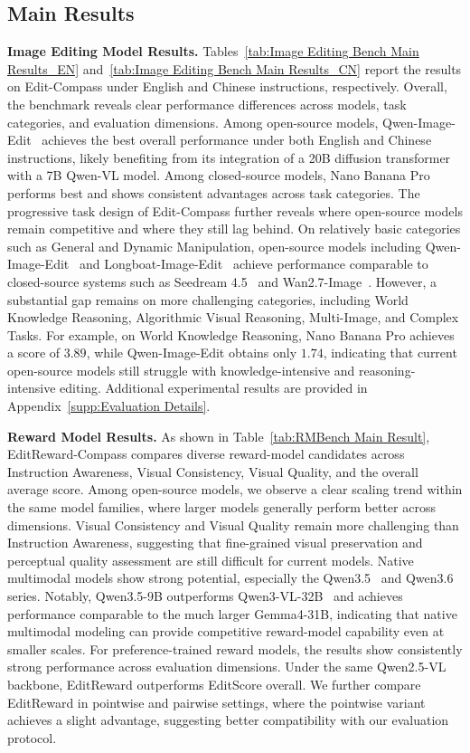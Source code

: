 \documentclass{llmxive}
\providecommand{\bench}{Edit-Compass}
\providecommand{\rmbench}{EditReward-Compass}
\begin{document}
\subsection{Main Results}
\textbf{Image Editing Model Results.}
Tables~\ref{tab:Image Editing Bench Main Results_EN} and~\ref{tab:Image Editing Bench Main Results_CN} report the results on {\bench} under English and Chinese instructions, respectively. Overall, the benchmark reveals clear performance differences across models, task categories, and evaluation dimensions.
Among open-source models, Qwen-Image-Edit~\cite{wu2025qwen} achieves the best overall performance under both English and Chinese instructions, likely benefiting from its integration of a 20B diffusion transformer with a 7B Qwen-VL model. Among closed-source models, Nano Banana Pro~\cite{nanobananapro} performs best and shows consistent advantages across task categories.
The progressive task design of {\bench} further reveals where open-source models remain competitive and where they still lag behind. On relatively basic categories such as General and Dynamic Manipulation, open-source models including Qwen-Image-Edit~\cite{wu2025qwen} and Longboat-Image-Edit~\cite{team2025longcat} achieve performance comparable to closed-source systems such as Seedream 4.5~\cite{seedream2025seedream} and Wan2.7-Image~\cite{wan}. However, a substantial gap remains on more challenging categories, including World Knowledge Reasoning, Algorithmic Visual Reasoning, Multi-Image, and Complex Tasks. For example, on World Knowledge Reasoning, Nano Banana Pro achieves a score of $3.89$, while Qwen-Image-Edit obtains only $1.74$, indicating that current open-source models still struggle with knowledge-intensive and reasoning-intensive editing.
Additional experimental results are provided in Appendix~\ref{supp:Evaluation Details}.


\textbf{Reward Model Results.}
As shown in Table~\ref{tab:RMBench Main Result}, {\rmbench} compares diverse reward-model candidates across Instruction Awareness, Visual Consistency, Visual Quality, and the overall average score. Among open-source models, we observe a clear scaling trend within the same model families, where larger models generally perform better across dimensions. Visual Consistency and Visual Quality remain more challenging than Instruction Awareness, suggesting that fine-grained visual preservation and perceptual quality assessment are still difficult for current models.
Native multimodal models show strong potential, especially the Qwen3.5~\cite{qwen3.5} and Qwen3.6~\cite{qwen3.6-27b,qwen36_35b_a3b} series. Notably, Qwen3.5-9B outperforms Qwen3-VL-32B~\cite{bai2025qwen3} and achieves performance comparable to the much larger Gemma4-31B, indicating that native multimodal modeling can provide competitive reward-model capability even at smaller scales.
For preference-trained reward models, the results show consistently strong performance across evaluation dimensions. Under the same Qwen2.5-VL backbone, EditReward outperforms EditScore overall. We further compare EditReward in pointwise and pairwise settings, where the pointwise variant achieves a slight advantage, suggesting better compatibility with our evaluation protocol.
\end{document}
